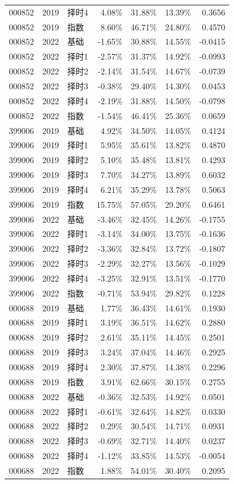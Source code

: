 \documentclass[UTF8,a4paper,11pt,fontset=fandol]{ctexart}
\begin{document}
\begin{longtable}{ll l rrrr}
000852 & 2019 & 择时4 & 4.08\% & 31.88\% & 13.39\% & 0.3656\\
000852 & 2019 & 指数 & 8.60\% & 46.71\% & 24.80\% & 0.4570\\
000852 & 2022 & 基础 & -1.65\% & 30.88\% & 14.55\% & -0.0415\\
000852 & 2022 & 择时1 & -2.57\% & 31.37\% & 14.92\% & -0.0993\\
000852 & 2022 & 择时2 & -2.14\% & 31.54\% & 14.67\% & -0.0739\\
000852 & 2022 & 择时3 & -0.38\% & 29.40\% & 14.30\% & 0.0453\\
000852 & 2022 & 择时4 & -2.19\% & 31.88\% & 14.50\% & -0.0798\\
000852 & 2022 & 指数 & -1.54\% & 46.41\% & 25.36\% & 0.0659\\\midrule
399006 & 2019 & 基础 & 4.92\% & 34.50\% & 14.05\% & 0.4124\\
399006 & 2019 & 择时1 & 5.95\% & 35.61\% & 13.82\% & 0.4870\\
399006 & 2019 & 择时2 & 5.10\% & 35.48\% & 13.81\% & 0.4293\\
399006 & 2019 & 择时3 & 7.70\% & 34.27\% & 13.89\% & 0.6032\\
399006 & 2019 & 择时4 & 6.21\% & 35.29\% & 13.78\% & 0.5063\\
399006 & 2019 & 指数 & 15.75\% & 57.05\% & 29.20\% & 0.6461\\
399006 & 2022 & 基础 & -3.46\% & 32.45\% & 14.26\% & -0.1755\\
399006 & 2022 & 择时1 & -3.14\% & 34.00\% & 13.75\% & -0.1636\\
399006 & 2022 & 择时2 & -3.36\% & 32.84\% & 13.72\% & -0.1807\\
399006 & 2022 & 择时3 & -2.29\% & 32.27\% & 13.56\% & -0.1029\\
399006 & 2022 & 择时4 & -3.25\% & 32.91\% & 13.51\% & -0.1770\\
399006 & 2022 & 指数 & -0.71\% & 53.94\% & 29.82\% & 0.1228\\\midrule
000688 & 2019 & 基础 & 1.77\% & 36.43\% & 14.61\% & 0.1930\\
000688 & 2019 & 择时1 & 3.19\% & 36.51\% & 14.62\% & 0.2880\\
000688 & 2019 & 择时2 & 2.61\% & 35.11\% & 14.45\% & 0.2501\\
000688 & 2019 & 择时3 & 3.24\% & 37.04\% & 14.46\% & 0.2925\\
000688 & 2019 & 择时4 & 2.30\% & 37.87\% & 14.38\% & 0.2296\\
000688 & 2019 & 指数 & 3.91\% & 62.66\% & 30.15\% & 0.2755\\
000688 & 2022 & 基础 & -0.36\% & 32.53\% & 14.92\% & 0.0501\\
000688 & 2022 & 择时1 & -0.61\% & 32.64\% & 14.82\% & 0.0330\\
000688 & 2022 & 择时2 & 0.29\% & 30.54\% & 14.71\% & 0.0931\\
000688 & 2022 & 择时3 & -0.69\% & 32.71\% & 14.40\% & 0.0237\\
000688 & 2022 & 择时4 & -1.12\% & 33.85\% & 14.53\% & -0.0054\\
000688 & 2022 & 指数 & 1.88\% & 54.01\% & 30.40\% & 0.2095\\
\end{longtable}
\end{document}

